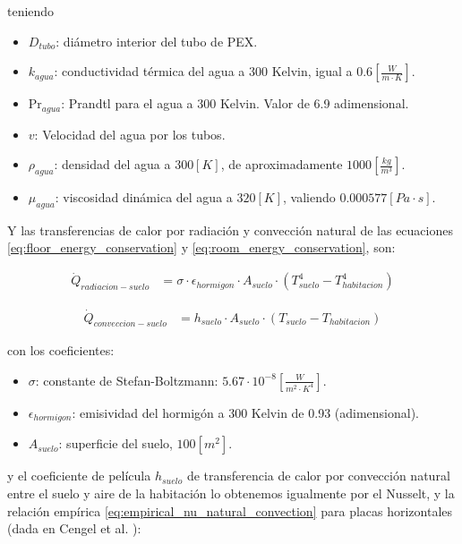 teniendo

\begin{itemize}
	\item $D_{tubo}$: diámetro interior del tubo de PEX.
	\item $k_{agua}$: conductividad térmica del agua a 300 Kelvin, igual a $0.6\left[\frac{W}{m \cdot K}\right]$.
	\item $\text{Pr}_{agua}$: Prandtl para el agua a 300 Kelvin. Valor de 6.9 adimensional.
	\item $v$: Velocidad del agua por los tubos.
	\item $\rho_{agua}$: densidad del agua a $300[K]$, de aproximadamente $1000\left[\frac{kg}{m^3}\right]$.
	\item $\mu_{agua}$: viscosidad dinámica del agua a $320[K]$, valiendo $0.000577[Pa \cdot s]$.
\end{itemize}


Y las transferencias de calor por radiación y convección natural de las
ecuaciones \eqref{eq:floor_energy_conservation} y
\eqref{eq:room_energy_conservation}, son:

\begin{align} \label{eq:q_radiacion}
	\dot{Q}_{radiacion-suelo} & =  \sigma \cdot \epsilon_{hormigon} \cdot A_{suelo} \cdot (T_{suelo}^4 - T_{habitacion}^4)
\end{align}

\begin{align} \label{eq:q_conveccion}
	\dot{Q}_{conveccion-suelo} & = h_{suelo} \cdot A_{suelo} \cdot (T_{suelo} - T_{habitacion})
\end{align}

con los coeficientes:

\begin{itemize}
	\item $\sigma$: constante de Stefan-Boltzmann: $5.67\cdot 10^{-8} \left[\frac{W}{m^2 \cdot K^4}\right]$.
	\item $\epsilon_{hormigon}$: emisividad del hormigón a 300 Kelvin de 0.93 (adimensional).
	\item $A_{suelo}$: superficie del suelo, $100[m^2]$.
\end{itemize}

y el coeficiente de película $h_{suelo}$ de transferencia de calor por
convección natural entre el suelo y aire de la habitación lo obtenemos
igualmente por el Nusselt, y la relación empírica
\eqref{eq:empirical_nu_natural_convection} para placas horizontales (dada en
Cengel et al. \cite{cengel2007transferencia}):

